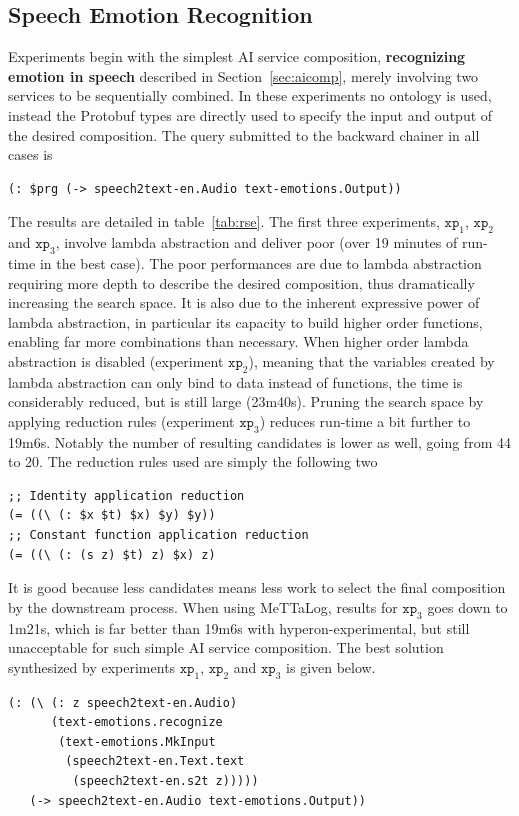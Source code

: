 \documentclass[]{report}
\begin{document}
\subsection{Speech Emotion Recognition}
Experiments begin with the simplest AI service composition,
\textbf{recognizing emotion in speech} described in
Section~\ref{sec:aicomp}, merely involving two services to be
sequentially combined.  In these experiments no ontology is used,
instead the Protobuf types are directly used to specify the input and
output of the desired composition.  The query submitted to the
backward chainer in all cases is
\begin{verbatim}
(: $prg (-> speech2text-en.Audio text-emotions.Output))
\end{verbatim}
The results are detailed in table~\ref{tab:rse}.  The first three
experiments, $\texttt{xp}_1$, $\texttt{xp}_2$ and $\texttt{xp}_3$,
involve lambda abstraction and deliver poor (over 19 minutes of
run-time in the best case).  The poor performances are due to lambda
abstraction requiring more depth to describe the desired composition,
thus dramatically increasing the search space.  It is also due to the
inherent expressive power of lambda abstraction, in particular its
capacity to build higher order functions, enabling far more
combinations than necessary.  When higher order lambda abstraction is
disabled (experiment $\texttt{xp}_2$), meaning that the variables
created by lambda abstraction can only bind to data instead of
functions, the time is considerably reduced, but is still large
(23m40s).  Pruning the search space by applying reduction rules
(experiment $\texttt{xp}_3$) reduces run-time a bit further to 19m6s.
Notably the number of resulting candidates is lower as well, going
from 44 to 20.  The reduction rules used are simply the following two
\begin{verbatim}
;; Identity application reduction
(= ((\ (: $x $t) $x) $y) $y))
;; Constant function application reduction
(= ((\ (: (s z) $t) z) $x) z)
\end{verbatim}
It is good because less candidates means less work to select the final
composition by the downstream process.  When using MeTTaLog, results
for $\texttt{xp}_3$ goes down to 1m21s, which is far better than 19m6s
with hyperon-experimental, but still unacceptable for such simple AI
service composition.  The best solution synthesized by experiments
$\texttt{xp}_1$, $\texttt{xp}_2$ and $\texttt{xp}_3$ is given below.
\begin{verbatim}
(: (\ (: z speech2text-en.Audio)
      (text-emotions.recognize
       (text-emotions.MkInput
        (speech2text-en.Text.text
         (speech2text-en.s2t z)))))
   (-> speech2text-en.Audio text-emotions.Output))
\end{verbatim}
\end{document}

